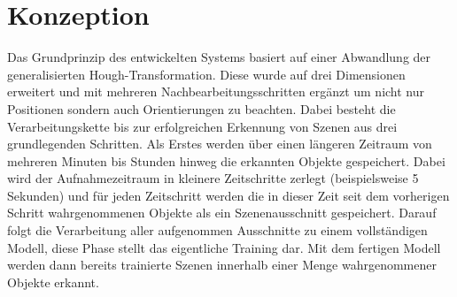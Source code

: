 \chapter{Konzeption}\label{ch:konzeption}

Das Grundprinzip des entwickelten Systems basiert auf einer Abwandlung der generalisierten Hough-Transformation.
Diese wurde auf drei Dimensionen erweitert und mit mehreren Nachbearbeitungsschritten ergänzt um nicht nur Positionen sondern auch Orientierungen zu beachten.
Dabei besteht die Verarbeitungskette bis zur erfolgreichen Erkennung von Szenen aus drei grundlegenden Schritten.
Als Erstes werden über einen längeren Zeitraum von mehreren Minuten bis Stunden hinweg die erkannten Objekte gespeichert.
Dabei wird der Aufnahmezeitraum in kleinere Zeitschritte zerlegt (beispielsweise 5 Sekunden) und für jeden Zeitschritt werden die in dieser Zeit seit dem vorherigen Schritt wahrgenommenen Objekte als ein Szenenausschnitt gespeichert.
Darauf folgt die Verarbeitung aller aufgenommen Ausschnitte zu einem vollständigen Modell, diese Phase stellt das eigentliche Training dar.
Mit dem fertigen Modell werden dann bereits trainierte Szenen innerhalb einer Menge wahrgenommener Objekte erkannt.

